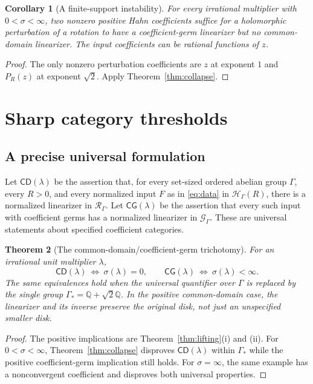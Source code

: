 \documentclass[11pt,a4paper]{article}
\numberwithin{equation}{section}
\newtheorem{theorem}{Theorem}[section]
\newtheorem{corollary}[theorem]{Corollary}
\theoremstyle{definition}
\theoremstyle{remark}
\newcommand{\Q}{\mathbb Q}
\newcommand{\HH}{\mathcal H}
\newcommand{\GG}{\mathcal G}
\newcommand{\RR}{\mathcal R}
\newcommand{\Gstar}{\Gamma_*}
\begin{document}
\begin{corollary}[A finite-support instability]\label{cor:finitefailure}
For every irrational multiplier with $0<\sigma<\infty$, two nonzero
positive Hahn coefficients suffice for a holomorphic perturbation of a
rotation to have a coefficient-germ linearizer but no common-domain
linearizer. The input coefficients can be rational functions of $z$.
\end{corollary}

\begin{proof}
The only nonzero perturbation coefficients are $z$ at exponent $1$ and
$P_R(z)$ at exponent $\sqrt2$. Apply Theorem~\ref{thm:collapse}.
\end{proof}

\section{Sharp category thresholds}\label{sec:thresholds}

\subsection{A precise universal formulation}

Let $\mathsf{CD}(\lambda)$ be the assertion that, for every set-sized
ordered abelian group $\Gamma$, every $R>0$, and every normalized input
$F$ as in \eqref{eq:data} in $\HH_\Gamma(R)$, there is a normalized
linearizer in $\RR_\Gamma$. Let $\mathsf{CG}(\lambda)$ be the assertion
that every such input with coefficient germs has a normalized linearizer
in $\GG_\Gamma$. These are universal statements about specified
coefficient categories.

\begin{theorem}[The common-domain/coefficient-germ trichotomy]\label{thm:trichotomy}
For an irrational unit multiplier $\lambda$,
\begin{equation}\label{eq:equiv}
 \mathsf{CD}(\lambda)\ \Longleftrightarrow\ \sigma(\lambda)=0,
 \qquad
 \mathsf{CG}(\lambda)\ \Longleftrightarrow\ \sigma(\lambda)<\infty.
\end{equation}
The same equivalences hold when the universal quantifier over $\Gamma$
is replaced by the single group $\Gstar=\Q+\sqrt2\Q$. In the positive
common-domain case, the linearizer and its inverse preserve the original
disk, not just an unspecified smaller disk.
\end{theorem}

\begin{proof}
The positive implications are Theorem~\ref{thm:lifting}(i) and (ii).
For $0<\sigma<\infty$, Theorem~\ref{thm:collapse} disproves
$\mathsf{CD}(\lambda)$ within $\Gstar$ while the positive coefficient-germ
implication still holds. For $\sigma=\infty$, the same example has a
nonconvergent coefficient and disproves both universal properties.
\end{proof}
\end{document}

